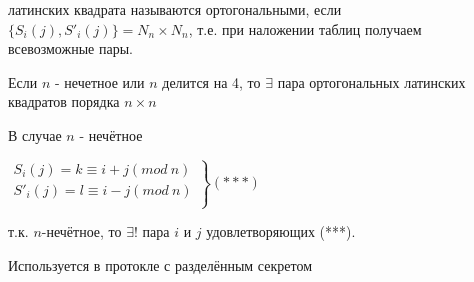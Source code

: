  латинских квадрата называются ортогональными, если $\{S_i(j),S'_i(j)\}=N_n\times N_n$, т.е. при наложении таблиц получаем всевозможные пары. 

\thr Если $n$ - нечетное или $n$ делится на 4, то $\exists$ пара ортогональных латинских квадратов порядка $n\times n$

В случае $n$ - нечётное\par
$\left.
\begin{array}{ccc}
	S_i(j)=k\equiv i+j(mod\:n)\\
	S'_i(j)=l\equiv i-j(mod\:n)\\
\end{array}
\right\}(***)$\par
т.к. $n$-нечётное, то $\exists !$ пара $i$ и $j$ удовлетворяющих (***).

\examplei Используется в протокле с разделённым секретом